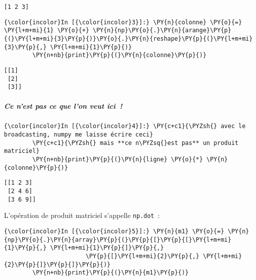     \begin{Verbatim}[commandchars=\\\{\},frame=single,framerule=0.3mm,rulecolor=\color{cellframecolor}]
[1 2 3]
\end{Verbatim}

    \begin{Verbatim}[commandchars=\\\{\},frame=single,framerule=0.3mm,rulecolor=\color{cellframecolor}]
{\color{incolor}In [{\color{incolor}3}]:} \PY{n}{colonne} \PY{o}{=} \PY{l+m+mi}{1} \PY{o}{+} \PY{n}{np}\PY{o}{.}\PY{n}{arange}\PY{p}{(}\PY{l+m+mi}{3}\PY{p}{)}\PY{o}{.}\PY{n}{reshape}\PY{p}{(}\PY{l+m+mi}{3}\PY{p}{,} \PY{l+m+mi}{1}\PY{p}{)}
        \PY{n+nb}{print}\PY{p}{(}\PY{n}{colonne}\PY{p}{)}
\end{Verbatim}


    \begin{Verbatim}[commandchars=\\\{\},frame=single,framerule=0.3mm,rulecolor=\color{cellframecolor}]
[[1]
 [2]
 [3]]
\end{Verbatim}

    \hypertarget{ce-nest-pas-ce-que-lon-veut-ici}{%
\subparagraph{Ce n'est pas ce que l'on veut
ici~!}\label{ce-nest-pas-ce-que-lon-veut-ici}}

    \begin{Verbatim}[commandchars=\\\{\},frame=single,framerule=0.3mm,rulecolor=\color{cellframecolor}]
{\color{incolor}In [{\color{incolor}4}]:} \PY{c+c1}{\PYZsh{} avec le broadcasting, numpy me laisse écrire ceci}
        \PY{c+c1}{\PYZsh{} mais **ce n\PYZsq{}est pas** un produit matriciel}
        \PY{n+nb}{print}\PY{p}{(}\PY{n}{ligne} \PY{o}{*} \PY{n}{colonne}\PY{p}{)}
\end{Verbatim}


    \begin{Verbatim}[commandchars=\\\{\},frame=single,framerule=0.3mm,rulecolor=\color{cellframecolor}]
[[1 2 3]
 [2 4 6]
 [3 6 9]]
\end{Verbatim}

    L'opération de produit matriciel s'appelle \texttt{np.dot}~:

    \begin{Verbatim}[commandchars=\\\{\},frame=single,framerule=0.3mm,rulecolor=\color{cellframecolor}]
{\color{incolor}In [{\color{incolor}5}]:} \PY{n}{m1} \PY{o}{=} \PY{n}{np}\PY{o}{.}\PY{n}{array}\PY{p}{(}\PY{p}{[}\PY{p}{[}\PY{l+m+mi}{1}\PY{p}{,} \PY{l+m+mi}{1}\PY{p}{]}\PY{p}{,}
                       \PY{p}{[}\PY{l+m+mi}{2}\PY{p}{,} \PY{l+m+mi}{2}\PY{p}{]}\PY{p}{]}\PY{p}{)}
        \PY{n+nb}{print}\PY{p}{(}\PY{n}{m1}\PY{p}{)}
\end{Verbatim}


